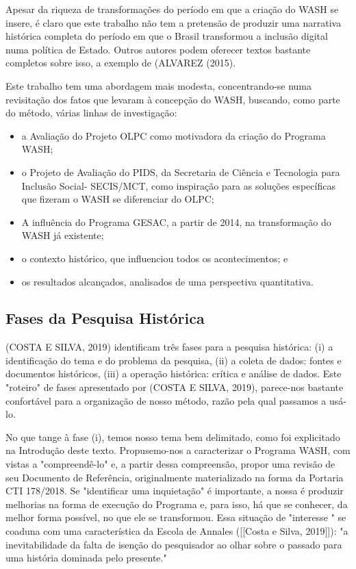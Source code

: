Apesar da riqueza de transformações do período em que a criação do WASH se insere, é claro que este trabalho não tem a pretensão de produzir uma narrativa histórica completa do período em que o Brasil transformou a inclusão digital numa política de Estado. Outros autores podem oferecer textos bastante completos sobre isso, a exemplo de  (ALVAREZ (2015).

Este trabalho tem uma abordagem mais modesta, concentrando-se numa revisitação dos fatos que levaram à concepção do WASH, buscando, como parte do método, várias linhas de investigação:


\begin{itemize}
\item a Avaliação do Projeto OLPC como motivadora da criação do Programa WASH;
\item o Projeto de Avaliação do PIDS, da Secretaria de Ciência e Tecnologia para Inclusão Social- SECIS/MCT, como inspiração para as soluções específicas que fizeram o WASH se diferenciar do OLPC;
\item A influência do Programa GESAC, a partir de 2014, na transformação do WASH já existente;
\item o contexto histórico, que influenciou todos os acontecimentos; e
\item os resultados alcançados, analisados de uma perspectiva quantitativa.
\end{itemize}

\subsection[Fases da Pesquisa Histórica]{Fases da Pesquisa Histórica}\label{Fases da Pesquisa Histórica}
(COSTA E SILVA, 2019) identificam três fases para a pesquisa histórica: (i) a identificação do tema e do problema da pesquisa, (ii) a coleta de dados: fontes e documentos históricos, (iii) a operação histórica: crítica e análise de dados. Este "roteiro" de fases apresentado por (COSTA E SILVA, 2019), parece-nos bastante confortável para a organização de nosso método, razão pela qual passamos a usá-lo.

No que tange à fase (i), temos nosso tema bem delimitado, como foi explicitado na Introdução deste texto. Propusemo-nos a caracterizar o Programa WASH, com vistas a "compreendê-lo" e, a partir dessa compreensão, propor uma revisão de seu Documento de Referência, originalmente materializado na forma da Portaria CTI 178/2018. Se "identificar uma inquietação" é importante, a nossa é produzir melhorias na forma de execução do Programa e, para isso, há que se conhecer, da melhor forma possível, no que ele se transformou. Essa situação de "interesse " se coaduna com uma característica da Escola de Annales  ([[Costa e Silva, 2019]]): "a inevitabilidade da falta de isenção do pesquisador ao olhar sobre o passado para uma história dominada pelo presente."

